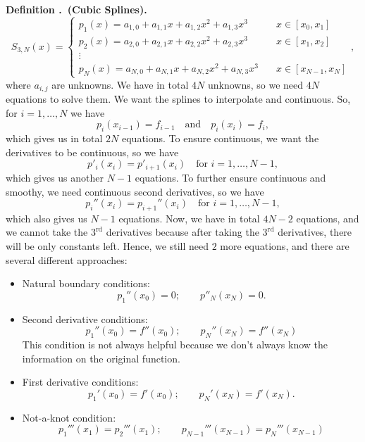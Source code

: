 \documentclass[12pt, a4paper]{article}
\newcounter{index}[subsection]
\newenvironment*{df}[1]{\par\noindent\textbf{Definition \thesubsection.\stepcounter{index}\theindex\ (#1).}}{\par}
\begin{document}
\begin{df}{Cubic Splines}
	\[S_{3,N}(x)=\begin{cases}p_1(x)=a_{1,0}+a_{1,1}x+a_{1,2}x^2+a_{1,3}x^3&\quad x\in[x_0,x_1]\\p_2(x)=a_{2,0}+a_{2,1}x+a_{2,2}x^2+a_{2,3}x^3&\quad x\in[x_1,x_2]\\\vdots\\p_N(x)=a_{N,0}+a_{N,1}x+a_{N,2}x^2+a_{N,3}x^3&\quad x\in[x_{N-1},x_N]\end{cases},\] where $a_{i,j}$ are unknowns. We have in total $4N$ unknowns, so we need $4N$ equations to solve them. We want the splines to interpolate and continuous. So, for $i=1,\dots, N$ we have \[p_i(x_{i-1})=f_{i-1}\quad\text{and}\quad p_i(x_i)=f_i,\] which gives us in total $2N$ equations. To ensure continuous, we want the derivatives to be continuous, so we have \[p'_i(x_i)=p'_{i+1}(x_i)\quad\text{for }i=1,\dots,N-1,\] which gives us another $N-1$ equations. To further ensure continuous and smoothy, we need continuous second derivatives, so we have \[p_i''(x_i)=p_{i+1}''(x_i)\quad\text{for }i=1,\dots,N-1,\] which also gives us $N-1$ equations. Now, we have in total $4N-2$ equations, and we cannot take the $3^\text{rd}$ derivatives because after taking the $3^\text{rd}$ derivatives, there will be only constants left. Hence, we still need $2$ more equations, and there are several different approaches: 
	\begin{itemize}
		\item Natural boundary conditions: \[p_1''(x_0)=0;\qquad p''_N(x_N)=0.\]
		\item Second derivative conditions: \[p_1''(x_0)=f''(x_0);\qquad p_N''(x_N)=f''(x_N)\] This condition is not always helpful because we don't always know the information on the original function.
		\item First derivative conditions: \[p_1'(x_0)=f'(x_0);\qquad p_N'(x_N)=f'(x_N).\]
		\item Not-a-knot condition: \[p_1'''(x_1)=p_2'''(x_1);\qquad p_{N-1}'''(x_{N-1})=p_N'''(x_{N-1})\]
	\end{itemize}
\end{df}
\end{document}
